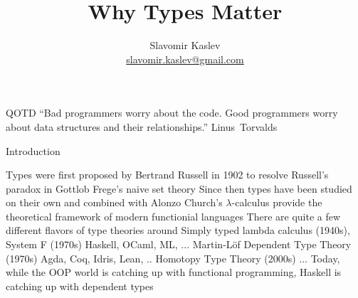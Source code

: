 \documentclass[pdf]{beamer}
\title{Why Types Matter}
\author{Slavomir Kaslev \\
  \href{mailto:slavomir.kaslev@gmail.com}{slavomir.kaslev@gmail.com}}
\begin{document}
\begin{frame}
  \titlepage
\end{frame}

\begin{frame}{QOTD}
  ``Bad programmers worry about the code. Good programmers worry about data structures and their relationships.'' \mbox{Linus Torvalds}
\end{frame}

\begin{frame}{Introduction}
  \begin{outline}
    \1 Types were first proposed by Bertrand Russell in 1902 to resolve Russell's paradox in Gottlob Frege's naive set theory
    \pause
    \1 Since then types have been studied on their own and combined with Alonzo Church's $\lambda$-calculus
    provide the theoretical framework of modern functionial languages
    \pause
    \1 There are quite a few different flavors of type theories around
    \pause
    \2 Simply typed lambda calculus (1940s), System F (1970s)
    \3 Haskell, OCaml, ML, ...
    \pause
    \2 Martin-Löf Dependent Type Theory (1970s)
    \3 Agda, Coq, Idris, Lean, ..
    \pause
    \2 Homotopy Type Theory (2000s)
    \pause
    \2 ...
    \pause
    \1 Today, while the OOP world is catching up with functional programming, Haskell is catching up with dependent types
  \end{outline}
\end{frame}
\end{document}
